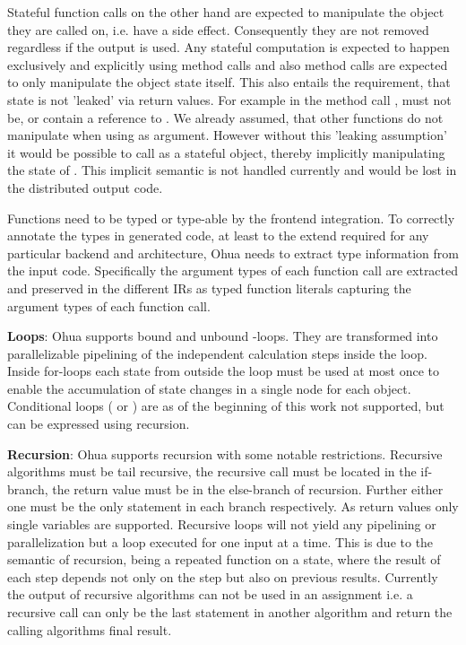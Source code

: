 Stateful function calls on the other hand are expected to manipulate the object they are called on, i.e. have a side effect. Consequently they are not removed regardless if the output is used. 
Any stateful computation is expected to happen exclusively and explicitly using  method calls and also method calls are expected to only manipulate the object state itself. This also entails the requirement, that state is not 'leaked' via return values. For example in the method call ,  must not be, or contain a reference to . We already assumed, that other functions do not manipulate  when using  as argument. However without this 'leaking assumption' it would be possible to call  as a stateful object, thereby implicitly manipulating the state of . This implicit semantic is not handled currently and would be lost in the distributed output code. 

Functions need to be typed or type-able by the frontend integration. To correctly annotate the types in generated code, at least to the extend required for any particular backend and architecture, Ohua needs to extract type information from the input code. Specifically the argument types of each function call are extracted and preserved in the different IRs as typed function literals capturing the argument types of each function call. 

\textbf{Loops}: Ohua supports bound and unbound -loops. They are transformed into parallelizable pipelining of the independent calculation steps inside the loop. Inside for-loops each state from outside the loop must be used at most once to enable the accumulation of state changes in a single node for each object. Conditional loops ( or ) are as of the beginning of this work not supported, but can be expressed using recursion.

\textbf{Recursion}: Ohua supports recursion with some notable restrictions. Recursive algorithms must be tail recursive, the recursive call must be located in the if-branch, the return value must be in the else-branch of recursion. Further either one must be the only statement in each branch respectively. As return values only single variables are supported. Recursive loops will not yield any pipelining or parallelization but a loop executed for one input at a time. This is due to the semantic of recursion, being a repeated function on a state, where the result of each step depends not only on the step but also on previous results.
Currently the output of recursive algorithms can not be used in an assignment i.e. a recursive call can only be the last statement in another algorithm and return the calling algorithms final result. 

